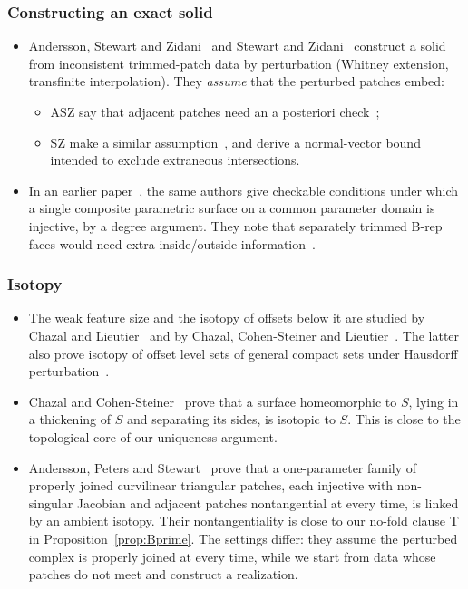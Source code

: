 \subsubsection*{Constructing an exact solid}
\begin{itemize}
\item Andersson, Stewart and Zidani~\cite{ASZ07} and Stewart and Zidani~\cite{SZ08} construct a solid from
inconsistent trimmed-patch data by perturbation (Whitney extension, transfinite interpolation). They \emph{assume}
that the perturbed patches embed:
  \begin{itemize}
  \item ASZ say that adjacent patches need an a posteriori check~\cite[pp.~819--820]{ASZ07};
  \item SZ make a similar assumption~\cite[p.~188]{SZ08}, and derive a normal-vector bound intended to exclude
  extraneous intersections.
  \end{itemize}
\item In an earlier paper~\cite{ASZ06}, the same authors give checkable conditions under which a single composite
parametric surface on a common parameter domain is injective, by a degree argument. They note that separately
trimmed B-rep faces would need extra inside/outside information~\cite[\S3.7]{ASZ06}.
\end{itemize}

\subsubsection*{Isotopy}
\begin{itemize}
\item The weak feature size and the isotopy of offsets below it are studied by Chazal and
Lieutier~\cite{ChazalLieutier07} and by Chazal, Cohen-Steiner and Lieutier~\cite{CCSL09dcg}. The latter
also prove isotopy of offset level sets of general compact sets under Hausdorff
perturbation~\cite[Thms.~4.2,~4.3]{CCSL09cg}.
\item Chazal and Cohen-Steiner~\cite[Thm.~2.1]{CCS05} prove that a surface homeomorphic to $S$, lying in a thickening
of $S$ and separating its sides, is isotopic to $S$. This is close to the topological core of our uniqueness
argument.
\item Andersson, Peters and Stewart~\cite[Thm.~1]{APS00} prove that a one-parameter family of properly joined
curvilinear triangular patches, each injective with non-singular Jacobian and adjacent patches nontangential at every
time, is linked by an ambient isotopy. Their nontangentiality is close to our no-fold clause T in
Proposition~\ref{prop:Bprime}. The settings differ: they assume the perturbed complex is properly joined at every time,
while we start from data whose patches do not meet and construct a realization.
\end{itemize}

